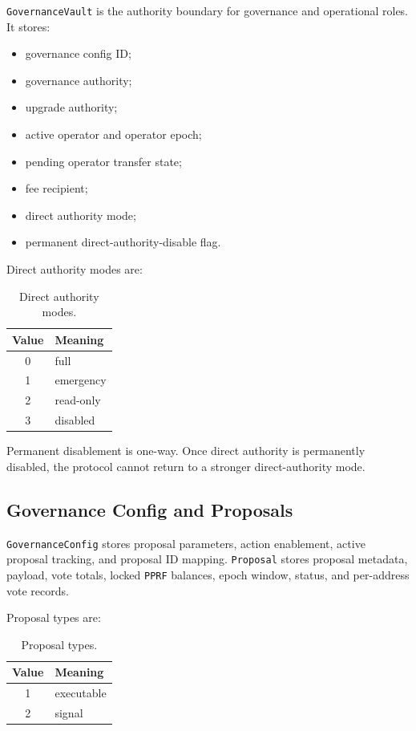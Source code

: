 \documentclass[11pt]{article}
\newcommand{\code}[1]{\texttt{#1}}
\newcommand{\pprf}{\code{PPRF}}
\begin{document}
\code{GovernanceVault} is the authority boundary for governance and operational roles. It stores:

\begin{itemize}[leftmargin=*]
  \item governance config ID;
  \item governance authority;
  \item upgrade authority;
  \item active operator and operator epoch;
  \item pending operator transfer state;
  \item fee recipient;
  \item direct authority mode;
  \item permanent direct-authority-disable flag.
\end{itemize}

Direct authority modes are:

\begin{table}[htbp]
\centering
\caption{Direct authority modes.}
\begin{tabular}{cl}
\toprule
\textbf{Value} & \textbf{Meaning} \\
\midrule
0 & full \\
1 & emergency \\
2 & read-only \\
3 & disabled \\
\bottomrule
\end{tabular}
\end{table}

Permanent disablement is one-way. Once direct authority is permanently disabled, the protocol cannot return to a stronger direct-authority mode.

\subsection{Governance Config and Proposals}

\code{GovernanceConfig} stores proposal parameters, action enablement, active proposal tracking, and proposal ID mapping. \code{Proposal} stores proposal metadata, payload, vote totals, locked \pprf{} balances, epoch window, status, and per-address vote records.

Proposal types are:

\begin{table}[htbp]
\centering
\caption{Proposal types.}
\begin{tabular}{cl}
\toprule
\textbf{Value} & \textbf{Meaning} \\
\midrule
1 & executable \\
2 & signal \\
\bottomrule
\end{tabular}
\end{table}
\end{document}

